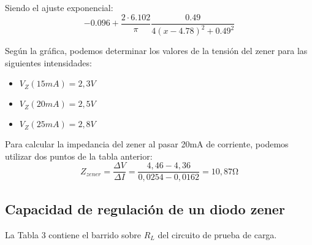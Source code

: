\documentclass[a4paper,12pt,spanish]{article}
\begin{document}

Siendo el ajuste exponencial:
\[-0.096 + \frac{2\cdot6.102}{\pi}\frac{0.49}{4(x-4.78)^2+0.49^2}\]


Según la gráfica, podemos determinar los valores de la tensión del zener para las siguientes intensidades:
\begin{itemize}
	\item $V_Z (15\si{mA}) = 2,3\si{V}$
	\item $V_Z (20\si{mA}) = 2,5\si{V}$
	\item $V_Z (25\si{mA}) = 2,8\si{V}$
\end{itemize}

Para calcular la impedancia del zener al pasar 20mA de corriente, podemos utilizar dos puntos de la tabla anterior:
\[ Z_{zener} = \frac{\Delta V}{\Delta I} = \frac{4,46- 4,36}{0,0254 - 0,0162} = 10,87 \si{\ohm} \]

\subsection*{Capacidad de regulación de un diodo zener}

La Tabla 3 contiene el barrido sobre $R_L$ del circuito de prueba de carga. 
\end{document}
